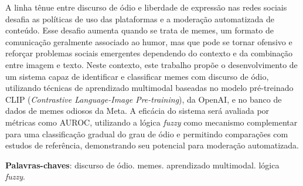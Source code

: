 \setlength{\absparsep}{18pt} %
\begin{resumo}

A linha tênue entre discurso de ódio e liberdade de expressão nas redes sociais desafia as políticas de uso das plataformas e a moderação automatizada de conteúdo. Esse desafio aumenta quando se trata de memes, um formato de comunicação geralmente associado ao humor, mas que pode se tornar ofensivo e reforçar problemas sociais emergentes dependendo do contexto e da combinação entre imagem e texto. Neste contexto, este trabalho propõe o desenvolvimento de um sistema capaz de identificar e classificar memes com discurso de ódio, utilizando técnicas de aprendizado multimodal baseadas no modelo pré-treinado CLIP (\textit{Contrastive Language-Image Pre-training}), da OpenAI, e no banco de dados de memes odiosos da Meta. A eficácia do sistema será avaliada por métricas como AUROC, utilizando a lógica \textit{fuzzy} como mecanismo complementar para uma classificação gradual do grau de ódio e permitindo comparações com estudos de referência, demonstrando seu potencial para moderação automatizada.


\textbf{Palavras-chaves}: discurso de ódio. memes. aprendizado multimodal. lógica \textit{fuzzy}.
\end{resumo}

